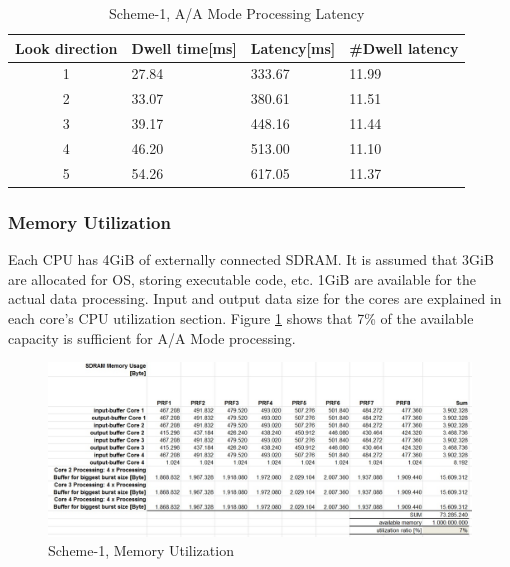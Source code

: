 \begin{table}[h!]
	\centering
	\begin{tabular}{|c|l|l|l|} 
	 \hline
	 \textbf{Look direction} & \textbf{Dwell time[ms]} & \textbf{Latency[ms]} & \textbf{\#Dwell latency} \\
	 \hline
	 1 & 27.84 & 333.67 & 11.99 \\ \hline
	 2 & 33.07 & 380.61 & 11.51 \\ \hline
	 3 & 39.17 & 448.16 & 11.44 \\ \hline
	 4 & 46.20 & 513.00 & 11.10 \\ \hline
	 5 & 54.26 & 617.05 & 11.37 \\ \hline
	\end{tabular}
	\caption{Scheme-1, A/A Mode Processing Latency}
	\label{tbl:existing_analysis:aa_scheme1_latency}
\end{table}

\subsubsection{Memory Utilization}
\label{sec:scheme1:mem_util}
Each CPU has 4GiB of externally connected SDRAM. It is assumed that 3GiB are allocated for OS, storing executable code, etc. 1GiB are available for the actual data processing. Input and output data size for the cores are explained in each core's CPU utilization section. Figure \ref{fig:existing_analysis:aa_scheme1_mem_util} shows that 7\% of the available capacity is sufficient for A/A Mode processing.

\begin{figure}[h!]
	\centering
	\includegraphics[width=160mm]{figures/aa_scheme1_mem_util}
	\caption{Scheme-1, Memory Utilization}
	\label{fig:existing_analysis:aa_scheme1_mem_util}
\end{figure}

